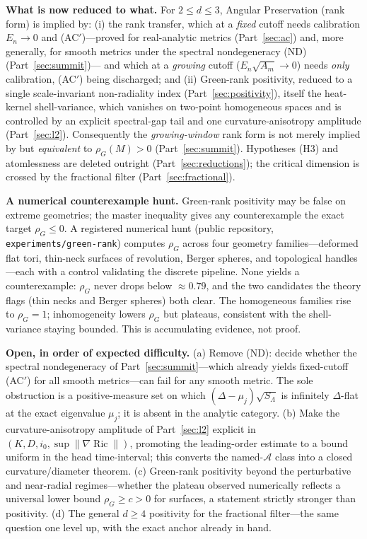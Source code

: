 \documentclass[11pt]{article}
\theoremstyle{remark}
\DeclareMathOperator{\Ric}{Ric}
\begin{document}
\medskip
\noindent\textbf{What is now reduced to what.} For $2\le d\le3$, Angular Preservation (rank
form) is implied by: (i) the rank transfer, which at a \emph{fixed} cutoff needs calibration
$E_n\to0$ and (AC$'$)---proved for real-analytic metrics (Part~\ref{sec:ac}) and, more
generally, for smooth metrics under the spectral nondegeneracy (ND) (Part~\ref{sec:summit})---%
and which at a \emph{growing} cutoff ($E_n\sqrt{A_m}\to0$) needs \emph{only} calibration,
(AC$'$) being discharged; and (ii) Green-rank positivity, reduced to a
single scale-invariant non-radiality index (Part~\ref{sec:positivity}), itself the
heat-kernel shell-variance, which vanishes on two-point homogeneous spaces and is controlled
by an explicit spectral-gap tail and one curvature-anisotropy amplitude
(Part~\ref{sec:l2}). Consequently the \emph{growing-window} rank form is not merely implied by
but \emph{equivalent} to $\rho_G(M)>0$ (Part~\ref{sec:summit}). Hypotheses (H3) and
atomlessness are deleted outright (Part~\ref{sec:reductions}); the critical dimension is
crossed by the fractional filter (Part~\ref{sec:fractional}).

\medskip
\noindent\textbf{A numerical counterexample hunt.} Green-rank positivity may be false on
extreme geometries; the master inequality gives any counterexample the exact target
$\rho_G\le0$. A registered numerical hunt (public repository,
\texttt{experiments/green-rank}) computes $\rho_G$ across four geometry families---deformed
flat tori, thin-neck surfaces of revolution, Berger spheres, and topological handles---each
with a control validating the discrete pipeline. None yields a counterexample: $\rho_G$
never drops below $\approx0.79$, and the two candidates the theory flags (thin necks and
Berger spheres) both clear. The homogeneous families rise to $\rho_G=1$; inhomogeneity lowers
$\rho_G$ but plateaus, consistent with the shell-variance staying bounded. This is
accumulating evidence, not proof.

\medskip
\noindent\textbf{Open, in order of expected difficulty.} (a) Remove (ND): decide whether the
spectral nondegeneracy of Part~\ref{sec:summit}---which already yields fixed-cutoff (AC$'$) for
all smooth metrics---can fail for any smooth metric. The sole obstruction is a positive-measure
set on which $(\Delta-\mu_j)\sqrt{S_\Lambda}$ is infinitely $\Delta$-flat at the exact
eigenvalue $\mu_j$; it is absent in the analytic category. (b) Make the curvature-anisotropy amplitude of Part~\ref{sec:l2} explicit in
$(K,D,i_0,\sup\lVert\nabla\Ric\rVert)$, promoting the leading-order estimate to a bound
uniform in the head time-interval; this converts the named-$\mathcal A$ class into a closed
curvature/diameter theorem. (c) Green-rank positivity beyond the perturbative and near-radial
regimes---whether the plateau observed numerically reflects a universal lower bound
$\rho_G\ge c>0$ for surfaces, a statement strictly stronger than positivity. (d) The general
$d\ge4$ positivity for the fractional filter---the same question one level up, with the exact
anchor already in hand.
\end{document}
